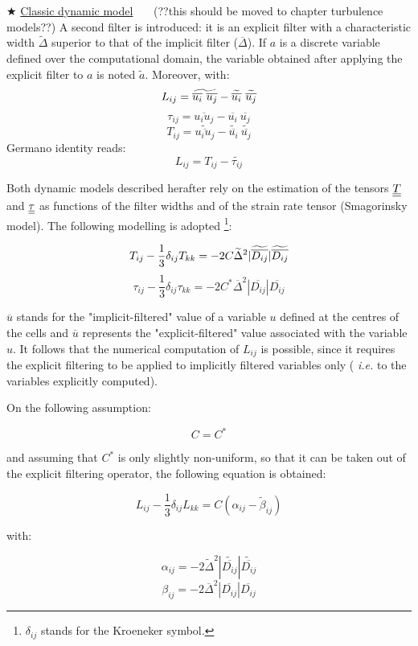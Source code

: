 {\tiny $\bigstar $} \underline{Classic dynamic model} \ \ \ (??this should
be moved to chapter turbulence models??) \newline
\newline
A second filter is introduced: it is an explicit filter with a
characteristic width $\widetilde{\Delta }$ superior to that of the implicit
filter ($\overline{\Delta }$). If $a$ is a discrete variable defined over
the computational domain, the variable obtained after applying the explicit
filter to $a$ is noted $\tilde{a}$. Moreover, with:
\[
L_{ij}=\widetilde{\overline{u_{i}}\ \overline{u_{j}}}-\widetilde{\overline{%
u_{i}}}\ \widetilde{\overline{u_{j}}}
\]%
\[
\tau _{ij}=\overline{u_{i}u_{j}}-\overline{u_{i}}\ \overline{u_{j}}
\]%
\[
T_{ij}=\widetilde{\overline{u_{i}u_{j}}}-\widetilde{\overline{u_{i}}}\
\widetilde{\overline{u_{j}}}
\]%
Germano identity reads:
\[
L_{ij}=T_{ij}-\widetilde{\tau _{ij}}
\]

Both dynamic models described herafter rely on the estimation of the tensors
$\underline{\underline{T}}$ and $\underline{\underline{\tau}}$ as functions of the filter widths and of the
strain rate tensor (Smagorinsky model). The following modelling is adopted%
\footnote{$\delta_{ij}$ stands for the Kroeneker symbol.}:

\[
T_{ij}-\frac{1}{3}\delta_{ij} T_{kk}= -2 C \widetilde{\Delta}^2 |\widetilde{%
\overline{D_{ij}}}| \widetilde{\overline{D_{ij}}}
\]
\[
\tau_{ij}-\frac{1}{3}\delta_{ij} \tau_{kk}= -2 C^* \overline{\Delta}^2 |%
\overline{D_{ij}}| \overline{D_{ij}}
\]

$\overline{u}$ stands for the "implicit-filtered" value of a variable $u$
defined at the centres of the cells and $\overline{u}$ represents the
"explicit-filtered" value associated with the variable $u$. It follows that
the numerical computation of $L_{ij}$ is possible, since it requires the
explicit filtering to be applied to implicitly filtered variables only (%
\textit{i.e.} to the variables explicitly computed).

On the following assumption:

\[
C = C^*
\]

and assuming that $C^*$ is only slightly non-uniform, so that it can be
taken out of the explicit filtering operator, the following equation is
obtained:

\[
L_{ij} -\frac{1}{3} \delta_{ij} L_{kk}= C (\alpha_{ij}-\widetilde{\beta}%
_{ij})
\]

with:

\[
\alpha_{ij} = -2 \widetilde{\Delta}^2 |\widetilde{\overline{D_{ij}}}|
\widetilde{\overline{D_{ij}}}
\]
\[
\beta_{ij} = -2 \overline{\Delta}^2 |\overline{D_{ij}}| \overline{D_{ij}}
\]

